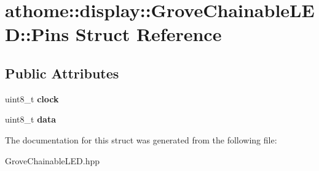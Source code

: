 \hypertarget{structathome_1_1display_1_1_grove_chainable_l_e_d_1_1_pins}{}\section{athome\+:\+:display\+:\+:Grove\+Chainable\+L\+ED\+:\+:Pins Struct Reference}
\label{structathome_1_1display_1_1_grove_chainable_l_e_d_1_1_pins}
\subsection*{Public Attributes}
\begin{DoxyCompactItemize}
\item 
\mbox{\label{structathome_1_1display_1_1_grove_chainable_l_e_d_1_1_pins_aeb0cdc4f20d987807ffb35deae4fa322}} 
uint8\+\_\+t {\bfseries clock}
\item 
\mbox{\label{structathome_1_1display_1_1_grove_chainable_l_e_d_1_1_pins_ae8603cd9e402170a5f575a1cc16c5d11}} 
uint8\+\_\+t {\bfseries data}
\end{DoxyCompactItemize}


The documentation for this struct was generated from the following file\+:\begin{DoxyCompactItemize}
\item 
Grove\+Chainable\+L\+E\+D.\+hpp\end{DoxyCompactItemize}
